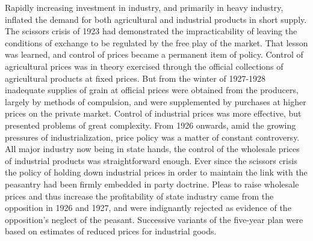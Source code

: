 Rapidly increasing investment in industry, and primarily in heavy industry, inflated the demand for both agricultural and industrial products in short supply. The scissors crisis of 1923 had demonstrated the impracticability of leaving the conditions of exchange to be regulated by the free play of the market. That lesson was learned, and control of prices became a permanent item of policy. Control of agricultural prices was in theory exercised through the official collections of agricultural products at fixed prices. But from the winter of 1927-1928 inadequate supplies of grain at official prices were obtained from the producers, largely by methods of compulsion, and were supplemented by purchases at higher prices on the private market. Control of industrial prices was more effective, but presented problems of great complexity. From 1926 onwards, amid the growing pressures of industrialization, price policy was a matter of constant controversy. All major industry now being in state hands, the control of the wholesale prices of industrial products was straightforward enough. Ever since the scissors crisis the policy of holding down industrial prices in order to maintain the link with the peasantry had been firmly embedded in party doctrine. Pleas to raise wholesale prices and thus increase the profitability of state industry came from the opposition in 1926 and 1927, and were indignantly rejected as evidence of the opposition's neglect of the peasant. Successive variants of the five-year plan were based on estimates of reduced prices for industrial goods. 

